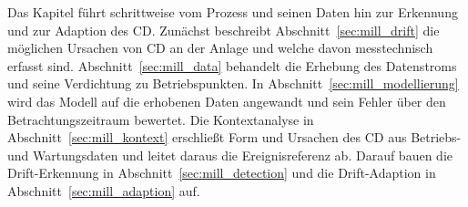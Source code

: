 %
Das Kapitel führt schrittweise vom Prozess und seinen Daten hin zur Erkennung und zur Adaption des \ac{CD}. Zunächst beschreibt Abschnitt~\ref{sec:mill_drift} die möglichen Ursachen von \ac{CD} an der Anlage und welche davon messtechnisch erfasst sind. Abschnitt~\ref{sec:mill_data} behandelt die Erhebung des Datenstroms und seine Verdichtung zu Betriebspunkten. In Abschnitt~\ref{sec:mill_modellierung} wird das Modell auf die erhobenen Daten angewandt und sein Fehler über den Betrachtungszeitraum bewertet. Die Kontextanalyse in Abschnitt~\ref{sec:mill_kontext} erschließt Form und Ursachen des \ac{CD} aus Betriebs- und Wartungsdaten und leitet daraus die Ereignisreferenz ab. Darauf bauen die Drift-Erkennung in Abschnitt~\ref{sec:mill_detection} und die Drift-Adaption in Abschnitt~\ref{sec:mill_adaption} auf. \par
%
